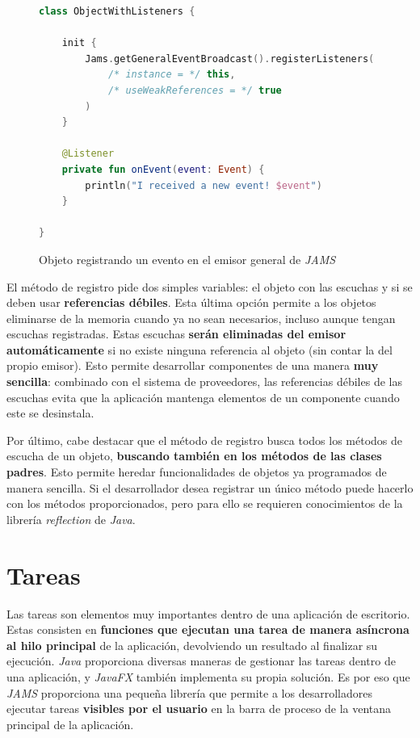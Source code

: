 \begin{figure}[h]
    \centering
    \begin{lstlisting}[frame=single,label={lst:event-registration-use},language=Kotlin]
class ObjectWithListeners {

    init {
        Jams.getGeneralEventBroadcast().registerListeners(
            /* instance = */ this,
            /* useWeakReferences = */ true
        )
    }

    @Listener
    private fun onEvent(event: Event) {
        println("I received a new event! $event")
    }

}
    \end{lstlisting}
    \caption{Objeto registrando un evento en el emisor general de \textit{JAMS}}
    \label{fig:event-registration}
\end{figure}

 El método de registro pide dos simples variables: el objeto
con las escuchas y si se deben usar \textbf{referencias débiles}.
Esta última opción permite a los objetos eliminarse de la memoria
cuando ya no sean necesarios, incluso aunque tengan escuchas registradas.
Estas escuchas \textbf{serán eliminadas del emisor automáticamente} si no existe
ninguna referencia al objeto (sin contar la del propio emisor).
Esto permite desarrollar componentes de una manera \textbf{muy sencilla}:
combinado con el sistema de proveedores, las referencias débiles
de las escuchas evita que la aplicación mantenga elementos de un
componente cuando este se desinstala.

 Por último, cabe destacar que el método de registro
busca todos los métodos de escucha de un objeto,
\textbf{buscando también en los métodos de las clases padres}.
Esto permite heredar funcionalidades de objetos ya programados
de manera sencilla.
Si el desarrollador desea registrar un único método puede hacerlo
con los métodos proporcionados, pero para ello se requieren
conocimientos de la librería \textit{reflection} de \textit{Java}.


\section{Tareas}\label{sec:tareas}

Las tareas son elementos muy importantes dentro de una aplicación
de escritorio.
Estas consisten en \textbf{funciones que ejecutan una tarea de manera
asíncrona al hilo principal} de la aplicación, devolviendo un
resultado al finalizar su ejecución.
\textit{Java} proporciona diversas maneras de gestionar
las tareas dentro de una aplicación, y \textit{JavaFX}
también implementa su propia solución.
Es por eso que \textit{JAMS} proporciona una pequeña
librería que permite a los desarrolladores ejecutar
tareas \textbf{visibles por el usuario} en la barra
de proceso de la ventana principal de la aplicación.

